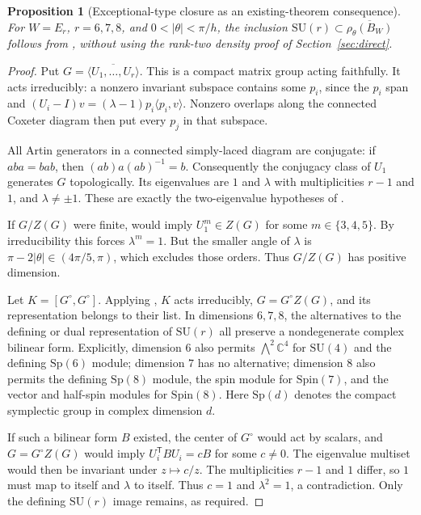 \documentclass[11pt,a4paper]{article}
\newtheorem{proposition}[theorem]{Proposition}
\theoremstyle{remark}\newtheorem{remark}[theorem]{Remark}
\newcommand{\SU}{\mathrm {SU}}
\newcommand{\C}{\mathbb C}
\begin{document}
\begin{proposition}[Exceptional-type closure as an existing-theorem consequence]
\label{prop:flw}
For $W=E_r$, $r=6,7,8$, and $0<|\theta|<\pi/h$, the inclusion
$\SU(r)\subset\overline{\rho_\theta(B_W)}$ follows from
\cite[Theorems~1.1, 1.4 and 1.6]{FLW}, without using the rank-two
density proof of Section~\ref{sec:direct}.
\end{proposition}
\begin{proof}
Put $G=\overline{\langle U_1,\ldots,U_r\rangle}$.  This is a compact
matrix group acting faithfully.  It acts irreducibly: a nonzero invariant
subspace contains some $p_i$, since the $p_i$ span and
$(U_i-I)v=(\lambda-1)p_i\langle p_i,v\rangle$.
Nonzero overlaps along the connected Coxeter diagram then put every
$p_j$ in that subspace.

All Artin generators in a connected simply-laced diagram are conjugate:
if $aba=bab$, then $(ab)a(ab)^{-1}=b$.
Consequently the conjugacy class of $U_1$ generates $G$ topologically.
Its eigenvalues are $1$ and $\lambda$ with multiplicities $r-1$ and $1$,
and $\lambda\ne\pm1$.  These are exactly the two-eigenvalue hypotheses
of \cite{FLW}.

If $G/Z(G)$ were finite, \cite[Theorem~1.6]{FLW} would imply
$U_1^m\in Z(G)$ for some $m\in\{3,4,5\}$.
By irreducibility this forces $\lambda^m=1$.  But the smaller angle
of $\lambda$ is $\pi-2|\theta|\in(4\pi/5,\pi)$, which excludes those
orders.  Thus $G/Z(G)$ has positive dimension.

Let $K=[G^\circ,G^\circ]$.  Applying
\cite[Theorems~1.1 and 1.4]{FLW}, $K$ acts irreducibly,
$G=G^\circ Z(G)$, and its representation belongs to their list.
In dimensions $6,7,8$, the alternatives to the defining or dual
representation of $\SU(r)$ all preserve a nondegenerate complex
bilinear form.  Explicitly, dimension $6$ also permits
$\bigwedge^2\C^4$ for $\SU(4)$ and the defining $\mathrm{Sp}(6)$
module; dimension $7$ has no alternative; dimension $8$ also permits
the defining $\mathrm{Sp}(8)$ module, the spin module for
$\mathrm{Spin}(7)$, and the vector and half-spin modules for
$\mathrm{Spin}(8)$.  Here $\mathrm{Sp}(d)$ denotes the compact
symplectic group in complex dimension $d$.

If such a bilinear form $B$ existed, the center of $G^\circ$ would
act by scalars, and $G=G^\circ Z(G)$ would imply
$U_i^{\mathsf T}BU_i=cB$ for some $c\ne0$.
The eigenvalue multiset would then be invariant under $z\mapsto c/z$.
The multiplicities $r-1$ and $1$ differ, so $1$ must map to itself and
$\lambda$ to itself.  Thus $c=1$ and $\lambda^2=1$, a contradiction.
Only the defining $\SU(r)$ image remains, as required.
\end{proof}
\end{document}

